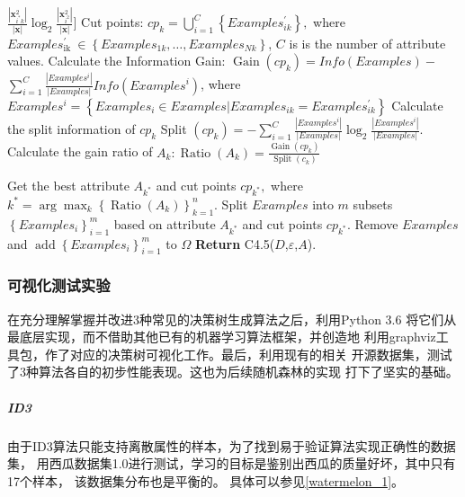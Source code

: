 \documentclass[main.tex]{subfiles}
\begin{document}
\begin{algorithm}
\begin{algorithmic}[1]
                    \State $\frac{\left|\mathbf{x}_{i^{*} k}^{2}\right|}{|\mathbf{x}|} \log _{2} \frac{\left|\mathbf{x}_{i^{2}}^{2}\right|}{|\mathbf{x}|}]$
                \Else
                \State Cut points: $c p_{k}=\bigcup_{i=1}^{C}\left\{Examples_{i k}^{\prime}\right\},$ 
                \State where $Examples_{\text {ik }}^{\prime} \in\left\{Examples_{1 k}, \ldots, Examples_{N k}\right\}$,
                \State $C$ is is the number of attribute values.
                \State Calculate the Information Gain:
                \State $\operatorname{Gain}\left(c p_{k}\right)=Info(Examples)-$
                \State $\sum_{i=1}^{C} \frac{\left|Examples^{i}\right|}{|Examples|} Info\left(Examples^{i}\right)$,
                \State where
                \State $Examples^{i}=\left\{Examples_{i} \in Examples | Examples_{i k}=Examples_{i k}^{\prime}\right\}$
                \State Calculate the split information of $c p_{k}$
                \State Split $\left(c p_{k}\right)=-\sum_{i=1}^{C} \frac{\left|Examples^{i}\right|}{|Examples|} \log _{2} \frac{\left|Examples^{i}\right|}{|Examples|}$.
                \EndIf
                \State Calculate the gain ratio of $A_{k}: \operatorname{Ratio}\left(A_{k}\right)=\frac{\operatorname{Gain}\left(c p_{k}\right)}{\operatorname{Split}\left(c_{k}\right)}$
                \EndFor
        \end{algorithmic}
    \end{algorithm}
    \begin{algorithm}                     
        \begin{algorithmic} [1]              
            \State Get the best attribute $A_{k^{*}}$ and cut points $c p_{k^{*}},$ where
            \State $k^{*}=\arg \max _{k}\left\{\operatorname{Ratio}\left(A_{k}\right)\right\}_{k=1}^{n}$.
            \State Split $Examples$ into $m$ subsets $\left\{Examples_{i}\right\}_{i=1}^{m}$ based on attribute $A_{k^{*}}$ and cut
            points $c p_{k^{*}}$.
            \State Remove $Examples$ and $\operatorname{add}\left\{Examples_{i}\right\}_{i=1}^{m}$ to $\Omega$
            \EndWhile
        \EndProcedure
    \State \textbf{Return} \textsc{C4.5}($D$,$\varepsilon$,$A$).
    \end{algorithmic}
\end{algorithm}

\subsubsection{可视化测试实验}
在充分理解掌握并改进3种常见的决策树生成算法之后，利用Python 3.6
将它们从最底层实现，而不借助其他已有的机器学习算法框架，并创造地
利用graphviz工具包，作了对应的决策树可视化工作。最后，利用现有的相关
开源数据集，测试了3种算法各自的初步性能表现。这也为后续随机森林的实现
打下了坚实的基础。
\subparagraph{ID3}
由于ID3算法只能支持离散属性的样本，为了找到易于验证算法实现正确性的数据集，
用西瓜数据集1.0\cite{zhzhou}进行测试，学习的目标是鉴别出西瓜的质量好坏，其中只有17个样本，
该数据集分布也是平衡的。
具体可以参见\ref{watermelon_1}。
\end{document}
